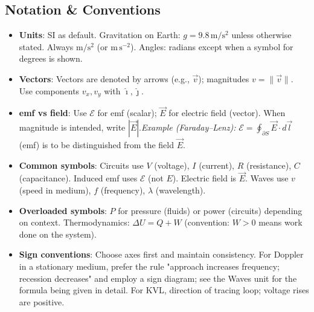 ﻿\documentclass[12pt,a4paper]{article}
\begin{document}
\subsection*{Notation \& Conventions}
\begin{itemize}[leftmargin=*]
  \item \textbf{Units}: SI as default. Gravitation on Earth: $g=9.8\,\mathrm{m/s^2}$ unless otherwise stated. Always $\mathrm{m/s^2}$ (or $\mathrm{m\,s^{-2}}$). Angles: radians except when a symbol for degrees is shown.
  \item \textbf{Vectors}: Vectors are denoted by arrows (e.g., $\vec v$); magnitudes $v=\|\vec v\|$. Use components $v_x,v_y$ with $\hat\imath,\hat\jmath$.
  \item \textbf{emf vs field}: Use $\mathcal E$ for emf (scalar); $\vec E$ for electric field (vector). When magnitude is intended, write $|\vec E|$.\;\textit{Example (Faraday--Lenz):} $\mathcal E=\oint_{\partial S}\vec E\cdot d\vec l$ (emf) is to be distinguished from the field $\vec E$.
  \item \textbf{Common symbols}: Circuits use $V$ (voltage), $I$ (current), $R$ (resistance), $C$ (capacitance). Induced emf uses $\mathcal E$ (not $E$). Electric field is $\vec E$. Waves use $v$ (speed in medium), $f$ (frequency), $\lambda$ (wavelength).
  \item \textbf{Overloaded symbols}: $P$ for pressure (fluids) or power (circuits) depending on context. Thermodynamics: $\Delta U=Q+W$ (convention: $W>0$ means work done on the system).
  \item \textbf{Sign conventions}: Choose axes first and maintain consistency. For Doppler in a stationary medium, prefer the rule "approach increases frequency; recession decreases" and employ a sign diagram; see the Waves unit for the formula being given in detail. For KVL, direction of tracing loop; voltage rises are positive.
\end{itemize}

\end{document}
